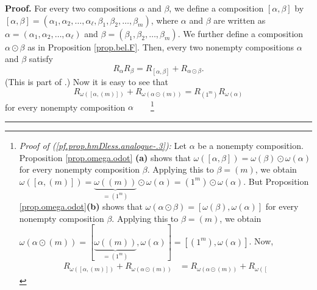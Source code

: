 \documentclass
[numbers=enddot,12pt,final,onecolumn,notitlepage,abstracton]{scrartcl}%
\theoremstyle{definition}
\newenvironment{proof}[1][Proof]{\noindent\textbf{#1.} }{\ \rule{0.5em}{0.5em}}
\newenvironment{verlong}{}{}
\begin{document}
\begin{verlong}
\begin{proof}
For every two compositions $\alpha$ and $\beta$, we define a composition
$\left[  \alpha,\beta\right]  $ by $\left[  \alpha,\beta\right]  =\left(
\alpha_{1},\alpha_{2},\ldots,\alpha_{\ell},\beta_{1},\beta_{2},\ldots
,\beta_{m}\right)  $, where $\alpha$ and $\beta$ are written as $\alpha
=\left(  \alpha_{1},\alpha_{2},\ldots,\alpha_{\ell}\right)  $ and
$\beta=\left(  \beta_{1},\beta_{2},\ldots,\beta_{m}\right)  $. We further
define a composition $\alpha\odot\beta$ as in Proposition \ref{prop.bel.F}.
Then, every two nonempty compositions $\alpha$ and $\beta$ satisfy%
\begin{equation}
R_{\alpha}R_{\beta}=R_{\left[  \alpha,\beta\right]  }+R_{\alpha\odot\beta}.
\label{pf.prop.hmDless.analogue-.2}%
\end{equation}
(This is part of \cite[Theorem 5.4.10(c)]{Reiner}.) Now it is easy to see that%
\begin{equation}
R_{\omega\left(  \left[  \alpha,\left(  m\right)  \right]  \right)
}+R_{\omega\left(  \alpha\odot\left(  m\right)  \right)  }=R_{\left(
1^{m}\right)  }R_{\omega\left(  \alpha\right)  }
\label{pf.prop.hmDless.analogue-.3}%
\end{equation}
for every nonempty composition $\alpha$\ \ \ \ \footnote{\textit{Proof of
(\ref{pf.prop.hmDless.analogue-.3}):} Let $\alpha$ be a nonempty composition.
Proposition \ref{prop.omega.odot} \textbf{(a)} shows that $\omega\left(
\left[  \alpha,\beta\right]  \right)  =\omega\left(  \beta\right)  \odot
\omega\left(  \alpha\right)  $ for every nonempty composition $\beta$.
Applying this to $\beta=\left(  m\right)  $, we obtain $\omega\left(  \left[
\alpha,\left(  m\right)  \right]  \right)  =\underbrace{\omega\left(  \left(
m\right)  \right)  }_{=\left(  1^{m}\right)  }\odot\omega\left(
\alpha\right)  =\left(  1^{m}\right)  \odot\omega\left(  \alpha\right)  $. But
Proposition \ref{prop.omega.odot}\textbf{(b)} shows that $\omega\left(
\alpha\odot\beta\right)  =\left[  \omega\left(  \beta\right)  ,\omega\left(
\alpha\right)  \right]  $ for every nonempty composition $\beta$. Applying
this to $\beta=\left(  m\right)  $, we obtain $\omega\left(  \alpha
\odot\left(  m\right)  \right)  =\left[  \underbrace{\omega\left(  \left(
m\right)  \right)  }_{=\left(  1^{m}\right)  },\omega\left(  \alpha\right)
\right]  =\left[  \left(  1^{m}\right)  ,\omega\left(  \alpha\right)  \right]
$. Now,%
\begin{align*}
R_{\omega\left(  \left[  \alpha,\left(  m\right)  \right]  \right)
}+R_{\omega\left(  \alpha\odot\left(  m\right)  \right)  }  &  =R_{\omega
\left(  \alpha\odot\left(  m\right)  \right)  }+R_{\omega\left(  \left[
}
\end{align*}}
\end{proof}
\end{verlong}
\end{document}

